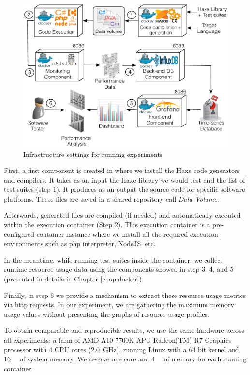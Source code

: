 \begin{figure}[h]
	\centering
	\includegraphics[width=0.8\linewidth]{chapitre4/fig/settingup.pdf}
	\caption{Infrastructure settings for running experiments}
	\label{fig:settingup.pdf}
\end{figure}

First, a first component is created in where we install the Haxe code generators and compilers. It takes as an input the Haxe library we would test and the list of test suites (step 1). It produces as an output the source code for specific software platforms. These files are saved in a shared repository call \textit{Data Volume}.

Afterwards, generated files are compiled (if needed) and automatically executed within the execution container (Step 2). This execution container is a pre-configured container instance where we install all the required execution environments such as php interpreter, NodeJS, etc. 

In the meantime, while running test suites inside the container, we collect runtime resource usage data using the components showed in step 3, 4, and 5 (presented in details in Chapter \ref{chap:docker}).

Finally, in step 6 we provide a mechanism to extract these resource usage metrics via http requests. In our experiment, we are gathering the maximum memory usage values without presenting the graphs of resource usage profiles.

To obtain comparable and reproducible results, we use the same hardware across all experiments: a farm of AMD A10-7700K APU Radeon(TM) R7 Graphics processor with 4 CPU cores (\SI{2.0}{\GHz}), running Linux with a 64 bit kernel and \SI{16}{\giga\byte} of system memory. We reserve one core and \SI{4}{\giga\byte} of memory for each running container. 


